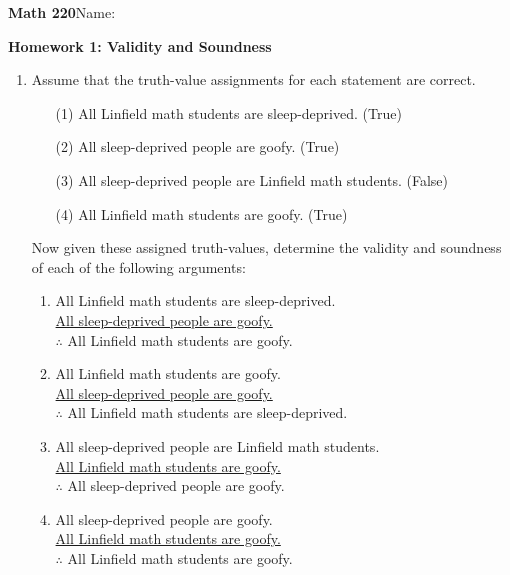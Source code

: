 \documentclass{article}
\begin{document}
{\bf Math 220}\hfill{Name:}

{\bf Homework 1: Validity and Soundness}
\vspace{.3in}


\begin{enumerate}
\item Assume that the truth-value assignments for each statement are correct.
\begin{itemize}
\item[(1)] All Linfield math students are sleep-deprived. (True)
\item[(2)] All sleep-deprived people are goofy. (True)
\item[(3)] All sleep-deprived people are Linfield math students. (False)
\item[(4)] All Linfield math students are goofy. (True)

\end{itemize}
 Now given these assigned truth-values, determine the validity and soundness of each of the following arguments:
 
 \begin{enumerate}
 \item All Linfield math students are sleep-deprived.\\
 \underline{All sleep-deprived people are goofy.}\\
 $\therefore$ All Linfield math students are goofy. 
 \vspace{1in}
 
 \item All Linfield math students are goofy.\\
  \underline{All sleep-deprived people are goofy.}\\
  $\therefore$ All Linfield math students are sleep-deprived.
   \vspace{1in}
  
  \item All sleep-deprived people are Linfield math students. \\
  \underline{All Linfield math students are goofy.}\\
  $\therefore$ All sleep-deprived people are goofy.
   \vspace{1in}
  
  \item All sleep-deprived people are goofy.\\
   \underline{All Linfield math students are goofy.}\\
   $\therefore$ All Linfield math students are goofy.
 \end{enumerate}
 

\end{enumerate}
\end{document}
